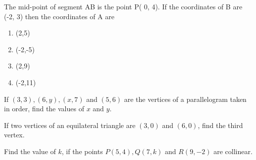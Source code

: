 
    \item The mid-point of segment AB is the point P( 0, 4). If the coordinates of B are (-2, 3) then the coordinates of A are
    \begin{enumerate}
        \item (2,5)
        \item (-2,-5)
        \item (2,9)
        \item (-2,11)
    \end{enumerate}
    \item If $(3,3),(6,y),(x,7)$ and $(5,6)$ are the vertices of a parallelogram taken in order, find the values of $x$ and $y$.
    \item If two vertices of an equilateral triangle are $(3,0)$ and $(6,0)$, find the third vertex.   
    \item Find the value of $k$, if the points $P(5,4),Q(7,k)$ and $R(9,-2)$ are collinear.

